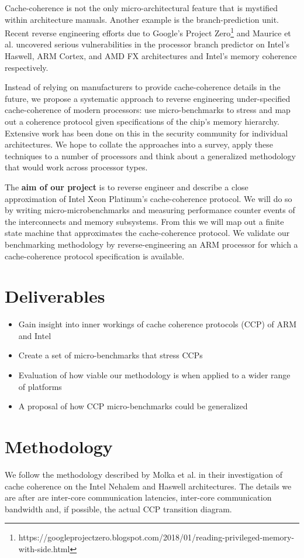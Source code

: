 \documentclass[11pt]{article}
\begin{document}
Cache-coherence is not the only micro-architectural feature that is mystified within architecture manuals. Another example is the branch-prediction unit. Recent reverse engineering efforts due to Google's Project Zero\footnote{https://googleprojectzero.blogspot.com/2018/01/reading-privileged-memory-with-side.html} and Maurice et al. \cite{maurice2015reverse} uncovered serious vulnerabilities in the processor branch predictor on Intel's Haswell, ARM Cortex, and AMD FX architectures and Intel's memory coherence respectively.

Instead of relying on manufacturers to provide cache-coherence details in the future, we propose a systematic approach to reverse engineering under-specified cache-coherence of modern processors: use micro-benchmarks to stress and map out a coherence protocol given specifications of the chip's memory hierarchy. Extensive work has been done on this in the security community for individual architectures. We hope to collate the approaches into a survey, apply these techniques to a number of processors and think about a generalized methodology that would work across processor types.

The \textbf{aim of our project} is to reverse engineer and describe a close approximation of Intel Xeon Platinum's cache-coherence protocol. We will do so by writing micro-microbenchmarks and measuring performance counter events of the interconnects and memory subsystems. From this we will map out a finite state machine that approximates the cache-coherence protocol. We validate our benchmarking methodology by reverse-engineering an ARM processor for which a cache-coherence protocol specification is available.

\section{Deliverables}
\begin{itemize}
    \item Gain insight into inner workings of cache coherence protocols (CCP) of ARM and Intel
    \item Create a set of micro-benchmarks that stress CCPs
    \item Evaluation of how viable our methodology is when applied to a wider range of platforms
    \item A proposal of how CCP micro-benchmarks could be generalized
\end{itemize}

\section{Methodology}
We follow the methodology described by Molka et al. \cite{molka2009memory,molka2015cache} in their investigation of cache coherence on the Intel Nehalem and Haswell architectures. The details we are after are inter-core communication latencies, inter-core communication bandwidth and, if possible, the actual CCP transition diagram.
\end{document}
